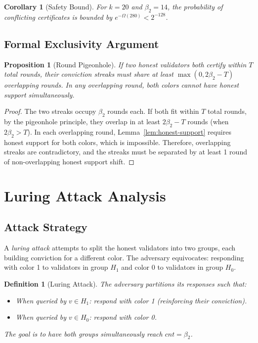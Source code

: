 \documentclass[11pt,a4paper]{article}
\newtheorem{corollary}[theorem]{Corollary}
\newtheorem{proposition}[theorem]{Proposition}
\newtheorem{definition}{Definition}[section]
\begin{document}
\begin{corollary}[Safety Bound]
\label{cor:safety-bound}
For $k = 20$ and $\beta_2 = 14$, the probability of conflicting certificates is
bounded by $e^{-\Omega(280)} < 2^{-128}$.
\end{corollary}

\subsection{Formal Exclusivity Argument}

\begin{proposition}[Round Pigeonhole]
\label{prop:pigeonhole}
If two honest validators both certify within $T$ total rounds, their conviction
streaks must share at least $\max(0, 2\beta_2 - T)$ overlapping rounds. In any
overlapping round, both colors cannot have honest support simultaneously.
\end{proposition}

\begin{proof}
The two streaks occupy $\beta_2$ rounds each. If both fit within $T$ total rounds,
by the pigeonhole principle, they overlap in at least $2\beta_2 - T$ rounds (when
$2\beta_2 > T$). In each overlapping round, Lemma~\ref{lem:honest-support} requires
honest support for both colors, which is impossible. Therefore, overlapping streaks
are contradictory, and the streaks must be separated by at least 1 round of non-overlapping
honest support shift.
\end{proof}

\section{Luring Attack Analysis}
\label{sec:attacks}

\subsection{Attack Strategy}

A \emph{luring attack} attempts to split the honest validators into two groups, each
building conviction for a different color. The adversary equivocates: responding with
color 1 to validators in group $H_1$ and color 0 to validators in group $H_0$.

\begin{definition}[Luring Attack]
The adversary partitions its responses such that:
\begin{itemize}[nosep]
\item When queried by $v \in H_1$: respond with color 1 (reinforcing their conviction).
\item When queried by $v \in H_0$: respond with color 0.
\end{itemize}
The goal is to have both groups simultaneously reach $cnt = \beta_2$.
\end{definition}
\end{document}
